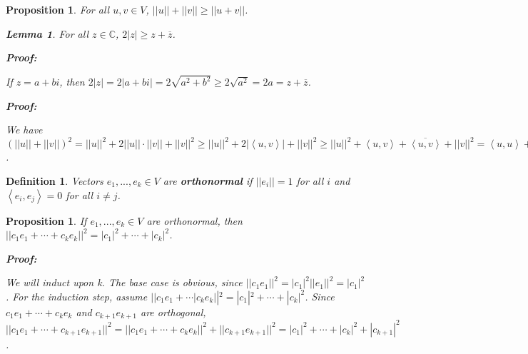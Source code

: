 \documentclass{article}
\theoremstyle{colontheorem}
\newtheorem{proposition}[theorem]{Proposition}
\newtheorem{definition}[theorem]{Definition}
\newtheorem{lemma}{Lemma}[theorem]
\newenvironment{Proposition}
{
	\begin{mdframed}[backgroundcolor=TheoremOrange!10]
	\begin{proposition}
}
{
	\end{proposition}
	\end{mdframed}
	
	\vspace{.15in}
}
\newenvironment{Def}
{
	\begin{mdframed}[backgroundcolor=DefGreen!10]
	\begin{definition}
}
{
	\end{definition}
	\end{mdframed}
	
	\vspace{.15in}
}
\newenvironment{Lemma}
{
	\begin{mdframed}[backgroundcolor=LemmaYellow!10]
	\begin{lemma}
}
{
	\end{lemma}
	\end{mdframed}
	
	\vspace{.03in}
}
\newenvironment{Proof}
{
	\begin{mdframed}[backgroundcolor=ProofPurple!10]
	\textbf{Proof:}%
}
{
	\end{mdframed}
	
	\vspace{.085in}
}
\begin{document}
\begin{Proposition}
	
	For all $u, v \in V$, $||u|| + ||v|| \geq ||u + v||$.
	
	\begin{Lemma}
		
		For all $z \in \mathbb{C}$, $2|z| \geq z + \overline{z}$.
		
		\begin{Proof}
			If $z = a+bi$, then $2|z| = 2|a+bi| = 2\sqrt{a^2 + b^2} \geq 2\sqrt{a^2} = 2a = z + \overline{z}$.
			
		\end{Proof}
		
	\end{Lemma}
	
	\begin{Proof}
		We have $\left( ||u|| + ||v|| \right)^2 = ||u||^2 + 2||u|| \cdot ||v|| + ||v||^2 \geq ||u||^2 + 2 | \left< u, v \right> | + ||v||^2 \geq ||u||^2 + \left< u, v \right> + \overline{\left< u, v \right>} + ||v||^2 = \left< u, u \right> + \left< u, v \right> + \left< v, u \right> + \left< v, v \right> = \left< u + v, u + v \right> = ||u + v||^2$.
		
	\end{Proof}

\end{Proposition}



\begin{Def}
	
	Vectors $e_1, ..., e_k \in V$ are \textbf{orthonormal} if $||e_i|| = 1$ for all $i$ and $\left< e_i, e_j \right> = 0$ for all $i \neq j$.
	
\end{Def}



\begin{Proposition}
	
	If $e_1, ..., e_k \in V$ are orthonormal, then $||c_1 e_1 + \cdots + c_k e_k||^2 = |c_1|^2 + \cdots + |c_k|^2$.
	
	\begin{Proof}
		We will induct upon k. The base case is obvious, since $||c_1 e_1||^2 = |c_1|^2 ||e_1||^2 = |c_1|^2$. For the induction step, assume $||c_1 e_1 + \cdots | c_k e_k||^2 = |c_1|^2 + \cdots + |c_k|^2$. Since $c_1 e_1 + \cdots + c_k e_k$ and $c_{k+1} e_{k+1}$ are orthogonal, $||c_1 e_1 + \cdots + c_{k+1} e_{k+1}||^2 = ||c_1 e_1 + \cdots + c_k e_k||^2 + ||c_{k+1} e_{k+1}||^2 = |c_1|^2 + \cdots + |c_k|^2 + |c_{k+1}|^2$.
		
	\end{Proof}
	
\end{Proposition}
\end{document}
